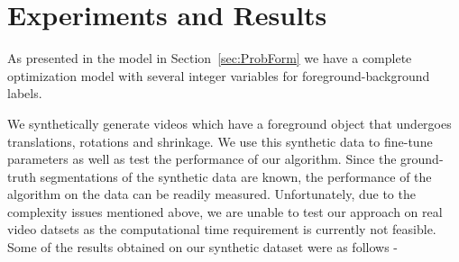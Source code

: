 \section{Experiments and Results}
\label{sec:Expt}
As presented in the model in Section~\ref{sec:ProbForm} we have a complete optimization
model with several integer variables for foreground-background labels.

%
%


We synthetically generate videos which have a foreground object that undergoes translations, rotations and shrinkage. We use this synthetic data to fine-tune parameters as well as test the performance of our algorithm. Since the ground-truth segmentations of the synthetic data are known, the performance of the algorithm on the data can be readily measured. Unfortunately, due to the complexity issues mentioned above, we are unable to test our approach on real video datsets as the computational time requirement is currently not feasible.
Some of the results obtained on our synthetic dataset were as follows -